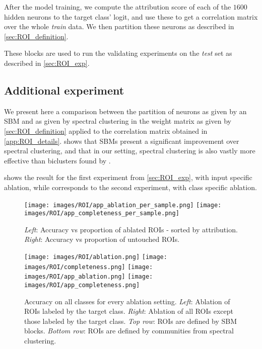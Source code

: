 \documentclass{article}
\begin{document}
After the model training, we compute the attribution score of each of the $1600$ hidden neurons to the target class' logit, and use these to get a correlation matrix over the whole \textit{train} data. We then partition these neurons as described in \cref{sec:ROI_definition}.

These blocks are used to run the validating experiments on the \textit{test} set as described in \cref{sec:ROI_exp}.

\subsection{Additional experiment}
\label{app:ROI_exp}

We present here a comparison between the partition of neurons as given by an SBM and as given by spectral clustering in the weight matrix as given by \cref{sec:ROI_definition} applied to the correlation matrix obtained in \cref{app:ROI_details}.  shows that SBMs present a significant improvement over spectral clustering, and that in our setting, spectral clustering is also vastly more effective than biclusters found by \citet{lu2019checking}.

 shows the result for the first experiment from \cref{sec:ROI_exp}, with input specific ablation, while  corresponds to the second experiment, with class specific ablation.


\begin{figure}[h]
    \centering
    \texttt{[image: images/ROI/app\_ablation\_per\_sample.png]}
    \hfill
    \texttt{[image: images/ROI/app\_completeness\_per\_sample.png]}
    \caption{\textit{Left}: Accuracy vs proportion of ablated ROIs - sorted by attribution. \textit{Right}: Accuracy vs proportion of untouched ROIs.}
    \label{fig:app_sample_ablation}
\end{figure}

\begin{figure}[h]
    \centering
    \texttt{[image: images/ROI/ablation.png]}
    \hfill
    \texttt{[image: images/ROI/completeness.png]}
    \vspace{1em}
    \texttt{[image: images/ROI/app\_ablation.png]}
    \hfill
    \texttt{[image: images/ROI/app\_completeness.png]}
    \caption{Accuracy on all classes for every ablation setting. \textit{Left}: Ablation of ROIs labeled by the target class. \textit{Right}: Ablation of all ROIs except those labeled by the target class. \textit{Top row}: ROIs are defined by SBM blocks. \textit{Bottom row}: ROIs are defined by communities from spectral clustering.}
    \label{fig:app_class_ablation}
\end{figure}
\end{document}
